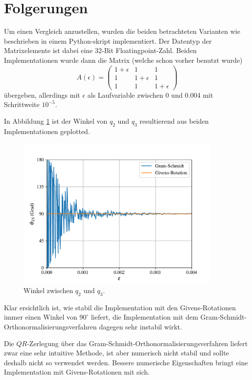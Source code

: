 %
%
%
\section{Folgerungen
\label{qr:section:folgerungen}}
Um einen Vergleich anzustellen, wurden die beiden betrachteten Varianten wie beschrieben in einem Python-skript implementiert. 
Der Datentyp der Matrixelemente ist dabei eine 32-Bit Floatingpoint-Zahl.
Beiden Implementationen wurde dann die Matrix (welche schon vorher benutzt wurde)
\begin{equation*}
	A(\epsilon)=
	\begin{pmatrix}
	1+\epsilon&1&1\\
	1&1+\epsilon&1\\
	1&1&1+\epsilon
	\end{pmatrix}
\end{equation*}
übergeben, allerdings mit $\epsilon$ als Laufvariable zwischen 0 und 0.004 mit Schrittweite $10^{-5}$.

In Abbildung \ref{qr:comp} ist der Winkel von $q_2$ und $q_3$ resultierend aus beiden Implementationen geplotted.
\begin{figure}[ht]
	\centering
	\includegraphics[width=0.9\textwidth]{papers/qr/pics/comp.pdf}
	\caption{Winkel zwischen $q_2$ und $q_3$.\label{qr:comp}}
\end{figure}
Klar ersichtlich ist, wie stabil die Implementation mit den Givens-Rotationen immer einen Winkel von $90^\circ$ liefert, die Implementation mit dem Gram-Schmidt-Orthonormalisierungsverfahren dagegen sehr instabil wirkt.

Die $QR$-Zerlegung über das Gram-Schmidt-Orthonormalisierungsverfahren liefert zwar eine sehr intuitive Methode, ist aber numerisch nicht stabil und sollte deshalb nicht so verwendet werden.
Bessere numerische Eigenschaften bringt eine Implementation mit Givens-Rotationen mit sich.